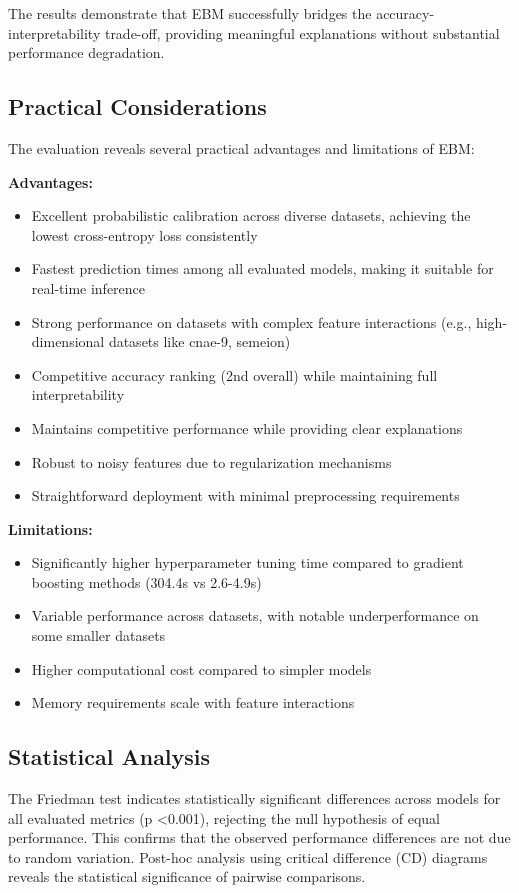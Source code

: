 \documentclass[12pt]{article}
\begin{document}
The results demonstrate that EBM successfully bridges the accuracy-interpretability trade-off, providing meaningful explanations without substantial performance degradation.

\subsection{Practical Considerations}

The evaluation reveals several practical advantages and limitations of EBM:

\textbf{Advantages:}
\begin{itemize}
\item Excellent probabilistic calibration across diverse datasets, achieving the lowest cross-entropy loss consistently
\item Fastest prediction times among all evaluated models, making it suitable for real-time inference
\item Strong performance on datasets with complex feature interactions (e.g., high-dimensional datasets like cnae-9, semeion)
\item Competitive accuracy ranking (2nd overall) while maintaining full interpretability
\item Maintains competitive performance while providing clear explanations
\item Robust to noisy features due to regularization mechanisms
\item Straightforward deployment with minimal preprocessing requirements
\end{itemize}

\textbf{Limitations:}
\begin{itemize}
\item Significantly higher hyperparameter tuning time compared to gradient boosting methods (304.4s vs 2.6-4.9s)
\item Variable performance across datasets, with notable underperformance on some smaller datasets
\item Higher computational cost compared to simpler models
\item Memory requirements scale with feature interactions
\end{itemize}

\subsection{Statistical Analysis}

The Friedman test indicates statistically significant differences across models for all evaluated metrics (p \textless 0.001), rejecting the null hypothesis of equal performance. This confirms that the observed performance differences are not due to random variation. Post-hoc analysis using critical difference (CD) diagrams reveals the statistical significance of pairwise comparisons.
\end{document}
